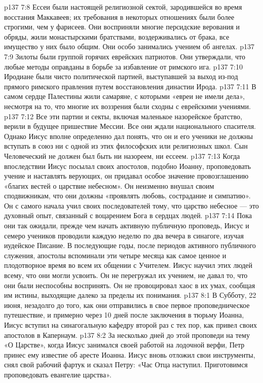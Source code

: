 \vs p137 7:8 \pc Ессеи были настоящей религиозной сектой, зародившейся во время восстания Маккавеев; их требования в некоторых отношениях были более строгими, чем у фарисеев. Они восприняли многие персидские верования и обряды, жили монастырскими братствами, воздерживались от брака, все имущество у них было общим. Они особо занимались учением об ангелах.
\vs p137 7:9 \pc Зилоты были группой горячих еврейских патриотов. Они утверждали, что любые методы оправданы в борьбе за избавление от римского ига.
\vs p137 7:10 \pc Иродиане были чисто политической партией, выступавшей за выход из\hyp{}под прямого римского правления путем восстановления династии Ирода.
\vs p137 7:11 \pc В самом сердце Палестины жили самаряне, с которыми «евреи не имели дела», несмотря на то, что многие их воззрения были сходны с еврейскими учениями.
\vs p137 7:12 \pc Все эти партии и секты, включая маленькое назорейское братство, верили в будущее пришествие Мессии. Все они ждали национального спасителя. Однако Иисус вполне определенно дал понять, что он и его ученики не должны вступать в союз ни с одной из этих философских или религиозных школ. Сын Человеческий не должен был быть ни назореем, ни ессеем.
\vs p137 7:13 Когда впоследствии Иисус посылал своих апостолов, подобно Иоанну, проповедовать учение и наставлять верующих, он придавал особое значение провозглашению «благих вестей о царствие небесном». Он неизменно внушал своим сподвижникам, что они должны «проявлять любовь, сострадание и симпатию». Он с самого начала учил своих последователей тому, что царство небесное --- это духовный опыт, связанный с воцарением Бога в сердцах людей.
\vs p137 7:14 Пока они так ожидали, прежде чем начать активную публичную проповедь, Иисус и семеро учеников проводили каждую неделю по два вечера в синагоге, изучая иудейское Писание. В последующие годы, после периодов активного публичного служения, апостолы вспоминали эти четыре месяца как самое ценное и плодотворное время во всем их общении с Учителем. Иисус научил этих людей всему, что они могли усвоить. Он не перегружал их учением, не давал то, что они были неспособны воспринять. Он не провоцировал хаос в их умах, сообщая им истины, выходящие далеко за пределы их понимания.
\vs p137 8:1 В Субботу, 22 июня, незадолго до того, как они отправились в свое первое проповедническое путешествие, и примерно через 10 дней после заключения в тюрьму Иоанна, Иисус вступил на синагогальную кафедру второй раз с тех пор, как привел своих апостолов в Капернаум.
\vs p137 8:2 За несколько дней до этой проповеди на тему «О Царстве», когда Иисус занимался своей работой на лодочной верфи, Петр принес ему известие об аресте Иоанна. Иисус вновь отложил свои инструменты, снял свой рабочий фартук и сказал Петру: «Час Отца наступил. Приготовимся проповедовать евангелие царства».
